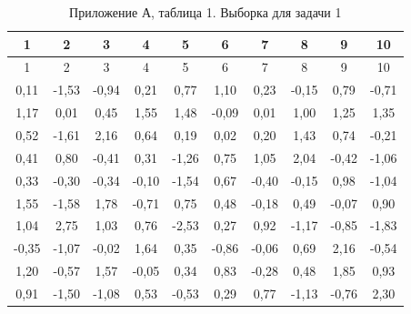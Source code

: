 \scriptsize
\setlength{\tabcolsep}{3pt}
\begin{longtable}{cccccccccc}
\caption{Приложение А, таблица 1. Выборка для задачи 1}\\
\toprule
1 & 2 & 3 & 4 & 5 & 6 & 7 & 8 & 9 & 10 \\
\midrule
\endfirsthead
\toprule
1 & 2 & 3 & 4 & 5 & 6 & 7 & 8 & 9 & 10 \\
\midrule
\endhead
0,11 & -1,53 & -0,94 & 0,21 & 0,77 & 1,10 & 0,23 & -0,15 & 0,79 & -0,71 \\
1,17 & 0,01 & 0,45 & 1,55 & 1,48 & -0,09 & 0,01 & 1,00 & 1,25 & 1,35 \\
0,52 & -1,61 & 2,16 & 0,64 & 0,19 & 0,02 & 0,20 & 1,43 & 0,74 & -0,21 \\
0,41 & 0,80 & -0,41 & 0,31 & -1,26 & 0,75 & 1,05 & 2,04 & -0,42 & -1,06 \\
0,33 & -0,30 & -0,34 & -0,10 & -1,54 & 0,67 & -0,40 & -0,15 & 0,98 & -1,04 \\
1,55 & -1,58 & 1,78 & -0,71 & 0,75 & 0,48 & -0,18 & 0,49 & -0,07 & 0,90 \\
1,04 & 2,75 & 1,03 & 0,76 & -2,53 & 0,27 & 0,92 & -1,17 & -0,85 & -1,83 \\
-0,35 & -1,07 & -0,02 & 1,64 & 0,35 & -0,86 & -0,06 & 0,69 & 2,16 & -0,54 \\
1,20 & -0,57 & 1,57 & -0,05 & 0,34 & 0,83 & -0,28 & 0,48 & 1,85 & 0,93 \\
0,91 & -1,50 & -1,08 & 0,53 & -0,53 & 0,29 & 0,77 & -1,13 & -0,76 & 2,30 \\
\bottomrule
\end{longtable}
